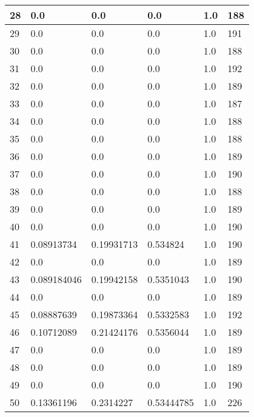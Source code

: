 \begin{longtable}{|l|l|l|l|l|l|}
28 & 0.0 & 0.0 & 0.0 & 1.0 & 188 \\ \hline 
29 & 0.0 & 0.0 & 0.0 & 1.0 & 191 \\ \hline 
30 & 0.0 & 0.0 & 0.0 & 1.0 & 188 \\ \hline 
31 & 0.0 & 0.0 & 0.0 & 1.0 & 192 \\ \hline 
32 & 0.0 & 0.0 & 0.0 & 1.0 & 189 \\ \hline 
33 & 0.0 & 0.0 & 0.0 & 1.0 & 187 \\ \hline 
34 & 0.0 & 0.0 & 0.0 & 1.0 & 188 \\ \hline 
35 & 0.0 & 0.0 & 0.0 & 1.0 & 188 \\ \hline 
36 & 0.0 & 0.0 & 0.0 & 1.0 & 189 \\ \hline 
37 & 0.0 & 0.0 & 0.0 & 1.0 & 190 \\ \hline 
38 & 0.0 & 0.0 & 0.0 & 1.0 & 188 \\ \hline 
39 & 0.0 & 0.0 & 0.0 & 1.0 & 189 \\ \hline 
40 & 0.0 & 0.0 & 0.0 & 1.0 & 190 \\ \hline 
41 & 0.08913734 & 0.19931713 & 0.534824 & 1.0 & 190 \\ \hline 
42 & 0.0 & 0.0 & 0.0 & 1.0 & 189 \\ \hline 
43 & 0.089184046 & 0.19942158 & 0.5351043 & 1.0 & 190 \\ \hline 
44 & 0.0 & 0.0 & 0.0 & 1.0 & 189 \\ \hline 
45 & 0.08887639 & 0.19873364 & 0.5332583 & 1.0 & 192 \\ \hline 
46 & 0.10712089 & 0.21424176 & 0.5356044 & 1.0 & 189 \\ \hline 
47 & 0.0 & 0.0 & 0.0 & 1.0 & 189 \\ \hline 
48 & 0.0 & 0.0 & 0.0 & 1.0 & 189 \\ \hline 
49 & 0.0 & 0.0 & 0.0 & 1.0 & 190 \\ \hline 
50 & 0.13361196 & 0.2314227 & 0.53444785 & 1.0 & 226 \\ \hline 
\end{longtable}